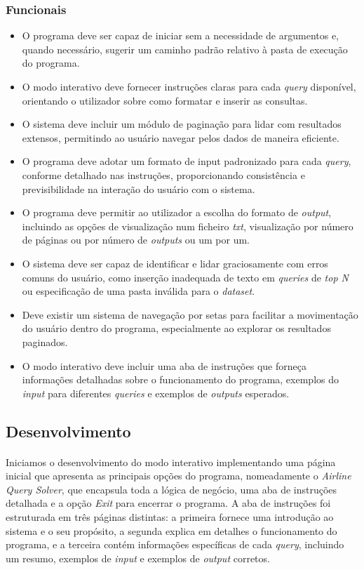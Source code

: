 \documentclass{article}
\begin{document}
\subsubsection{Funcionais}
\begin{itemize}
    \item O programa deve ser capaz de iniciar sem a necessidade de argumentos e, quando necessário, sugerir um caminho padrão relativo à pasta de execução do programa.
    \item O modo interativo deve fornecer instruções claras para cada \textit{query} disponível, orientando o utilizador sobre como formatar e inserir as consultas.
    \item O sistema deve incluir um módulo de paginação para lidar com resultados extensos, permitindo ao usuário navegar pelos dados de maneira eficiente.
    \item O programa deve adotar um formato de input padronizado para cada \textit{query}, conforme detalhado nas instruções, proporcionando consistência e previsibilidade na interação do usuário com o sistema.
    \item O programa deve permitir ao utilizador a escolha do formato de \textit{output}, incluindo as opções de visualização num ficheiro \textit{txt}, visualização por número de páginas ou por número de \textit{outputs} ou um por um.
    \item O sistema deve ser capaz de identificar e lidar graciosamente com erros comuns do usuário, como inserção inadequada de texto em \textit{queries} de \textit{top N} ou especificação de uma pasta inválida para o \textit{dataset}.
    \item Deve existir um sistema de navegação por setas para facilitar a movimentação do usuário dentro do programa, especialmente ao explorar os resultados paginados.
    \item O modo interativo deve incluir uma aba de instruções que forneça informações detalhadas sobre o funcionamento do programa, exemplos do \textit{input} para diferentes \textit{queries} e exemplos de \textit{outputs} esperados.
\end{itemize}
\subsection{Desenvolvimento}
\paragraph{}Iniciamos o desenvolvimento do modo interativo implementando uma página inicial que apresenta as principais opções do programa, nomeadamente o \textit{Airline Query Solver}, que encapsula toda a lógica de negócio, uma aba de instruções detalhada e a opção \textit{Exit} para encerrar o programa. A aba de instruções foi estruturada em três páginas distintas: a primeira fornece uma introdução ao sistema e o seu propósito, a segunda explica em detalhes o funcionamento do programa, e a terceira contém informações específicas de cada \textit{query}, incluindo um resumo, exemplos de \textit{input} e exemplos de \textit{output} corretos.
\vspace{-0.3cm}
\end{document}
